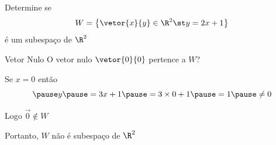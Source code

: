 \begin{question}
  Determine se
  \[
    W = \left\{ \vetor{x}{y} \in\R^{2} \st y=2x+1 \right\}
  \]
  é um subespaço de $\R^{2}$
\end{question}

\begin{resolution}{Vetor Nulo}
  O vetor nulo \(\vetor{0}{0}\) pertence a $W$?

  \pause
  Se $x=0$ então
  \[
    \pause
    y
    \pause
    = 3x + 1
    \pause
    = 3 \times 0 + 1
    \pause
    = 1
    \pause
    \neq 0
  \]

  \pause
  Logo
  \(
    \vec{0} \notin W
  \)

  \pause
  Portanto, $W$ não é subespaço de $\R^{2}$
\end{resolution}

\endinput